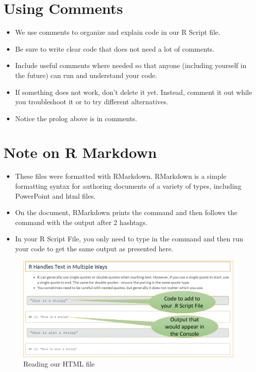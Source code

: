 \documentclass[
  letterpaper,
  DIV=11,
  numbers=noendperiod]{scrreprt}
\providecommand{\tightlist}{%
  \setlength{\itemsep}{0pt}\setlength{\parskip}{0pt}}\usepackage{longtable,booktabs,array}
\begin{document}
\section{Using Comments}\label{using-comments}

\begin{itemize}
\tightlist
\item
  We use comments to organize and explain code in our R Script file.
\item
  Be sure to write clear code that does not need a lot of comments.
\item
  Include useful comments where needed so that anyone (including
  yourself in the future) can run and understand your code.
\item
  If something does not work, don't delete it yet. Instead, comment it
  out while you troubleshoot it or to try different alternatives.
\item
  Notice the prolog above is in comments.
\end{itemize}

\section{Note on R Markdown}\label{note-on-r-markdown}

\begin{itemize}
\tightlist
\item
  These files were formatted with RMarkdown. RMarkdown is a simple
  formatting syntax for authoring documents of a variety of types,
  including PowerPoint and html files.
\item
  On the document, RMarkdown prints the command and then follows the
  command with the output after 2 hashtags.
\item
  In your R Script File, you only need to type in the command and then
  run your code to get the same output as presented here.
\end{itemize}

\begin{figure}[H]

{\centering \includegraphics{Pictures/Ch1/ReadHTML.png}

}

\caption{Reading our HTML file}

\end{figure}%
\end{document}

